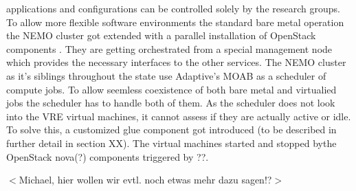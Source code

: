 applications and configurations can be controlled solely by the research groups.
To allow more flexible software environments the standard bare metal operation the NEMO
cluster got extended with a parallel installation of OpenStack components \cite{hpc-symp:2016}. They are getting orchestrated from a special management node which
provides the necessary interfaces to the other services. The NEMO cluster as it's siblings
throughout the state use Adaptive's MOAB as a scheduler of compute jobs. To allow
seemless coexistence of both bare metal and virtualied jobs the scheduler has to handle
both of them. As the scheduler does not look into the VRE virtual machines, it cannot assess
if they are actually active or idle. To solve this, a customized glue component got introduced
(to be described in further detail in section XX). The virtual machines started and stopped bythe OpenStack nova(?) components triggered by ??. 

$<$Michael, hier wollen wir evtl. noch etwas mehr dazu sagen!?$>$
